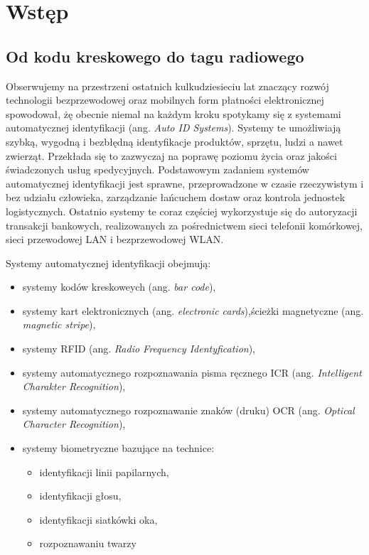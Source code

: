 \chapter{Wstęp}

\section{Od kodu kreskowego do tagu radiowego}

Obserwujemy na przestrzeni ostatnich kulkudziesieciu lat znaczący rozwój technologii bezprzewodowej oraz mobilnych form płatności elektronicznej spowodował, żę obecnie niemal na każdym kroku spotykamy się z systemami automatycznej identyfikacji (ang. \emph{Auto ID Systems}). Systemy te umożliwiają szybką, wygodną i bezbłędną identyfikacje produktów, sprzętu, ludzi a nawet zwierząt. Przekłada się to zazwyczaj na poprawę poziomu życia oraz jakości świadczonych usług spedycyjnych. Podstawowym zadaniem systemów automatycznej identyfikacji jest sprawne, przeprowadzone w czasie rzeczywistym i bez udziału człowieka, zarządzanie łańcuchem dostaw oraz kontrola jednostek logistycznych. Ostatnio systemy te coraz częściej wykorzystuje się do autoryzacji transakcji bankowych, realizowanych za pośrednictwem sieci telefonii komórkowej, sieci przewodowej LAN i bezprzewodowej WLAN.

Systemy automatycznej identyfikacji obejmują:
\begin{itemize}\setlength{\itemsep}{0pt}
    \item systemy kodów kreskoweych (ang. \emph{bar code}),
    \item systemy kart elektronicznych (ang. \emph{electronic cards}),ścieżki magnetyczne (ang. \emph{magnetic stripe}),
    \item systemy RFID (ang. \emph{Radio Frequency Identyfication}),
    \item systemy automatycznego rozpoznawania pisma ręcznego ICR (ang. \emph{Intelligent Charakter Recognition}), 
    \item systemy automatycznego rozpoznawanie znaków (druku) OCR (ang. \emph{Optical Character Recognition}),
    \item systemy biometryczne bazujące na technice:
	\begin{itemize}\setlength{\itemsep}{0pt}
		\item identyfikacji linii papilarnych,
		\item identyfikacji głosu,
		\item identyfikacji siatkówki oka,
		\item rozpoznawaniu twarzy
	\end{itemize}
\end{itemize}

